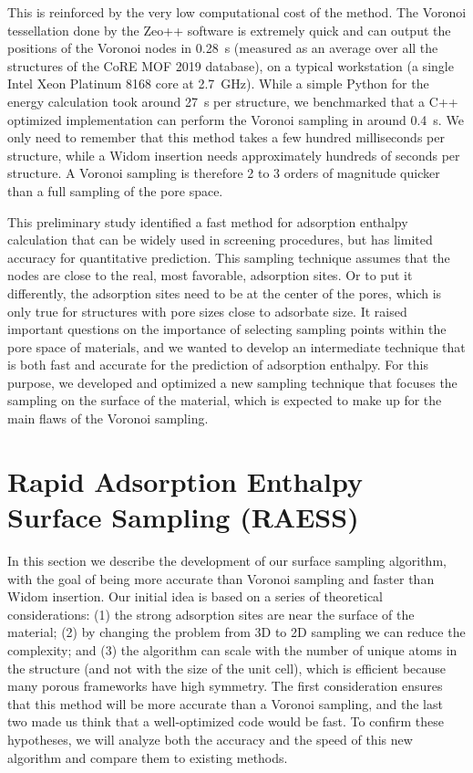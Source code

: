 \documentclass[main]{subfiles}
\begin{document}
This is reinforced by the very low computational cost of the method. The Voronoi tessellation done by the Zeo++ software is extremely quick and can output the positions of the Voronoi nodes in \SI{0.28}{\second} (measured as an average over all the structures of the CoRE MOF 2019 database), on a typical workstation (a single Intel Xeon Platinum 8168 core at 2.7~\si{\giga\hertz}). While a simple Python for the energy calculation took around \SI{27}{\second} per structure, we benchmarked that a C++ optimized implementation can perform the Voronoi sampling in around \SI{0.4}{\second}. We only need to remember that this method takes a few hundred milliseconds per structure, while a Widom insertion needs approximately hundreds of seconds per structure. A Voronoi sampling is therefore 2 to 3 orders of magnitude quicker than a full sampling of the pore space.

This preliminary study identified a fast method for adsorption enthalpy calculation that can be widely used in screening procedures, but has limited accuracy for quantitative prediction. This sampling technique assumes that the nodes are close to the real, most favorable, adsorption sites. Or to put it differently, the adsorption sites need to be at the center of the pores, which is only true for structures with pore sizes close to adsorbate size. It raised important questions on the importance of selecting sampling points within the pore space of materials, and we wanted to develop an intermediate technique that is both fast and accurate for the prediction of adsorption enthalpy. For this purpose, we developed and optimized a new sampling technique that focuses the sampling on the surface of the material, which is expected to make up for the main flaws of the Voronoi sampling.

\section{Rapid Adsorption Enthalpy Surface Sampling (RAESS)}


In this section we describe the development of our surface sampling algorithm, with the goal of being more accurate than Voronoi sampling and faster than Widom insertion. Our initial idea is based on a series of theoretical considerations: (1) the strong adsorption sites are near the surface of the material; (2) by changing the problem from 3D to 2D sampling we can reduce the complexity; and (3) the algorithm can scale with the number of unique atoms in the structure (and not with the size of the unit cell), which is efficient because many porous frameworks have high symmetry. The first consideration ensures that this method will be more accurate than a Voronoi sampling, and the last two made us think that a well-optimized code would be fast. To confirm these hypotheses, we will analyze both the accuracy and the speed of this new algorithm and compare them to existing methods.
\end{document}
